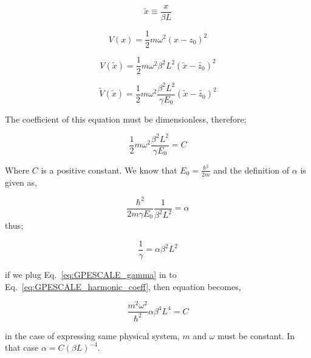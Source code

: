 \documentclass[a4paper,times,hidelinks,12pt]{article}
\begin{document}
\begin{equation}
\label{eq:GPESCALE_dimensionless_length}
    \widetilde{x} \equiv \frac{x}{\beta L} 
\end{equation}

\begin{equation}
\label{eq:GPESCALE_harmonic_potential}
    V(x) = \frac{1}{2}m\omega^2 (x-z_0)^2
\end{equation}

\begin{equation}
\label{eq:GPESCALE_harmonic_length_transform}
    V(\widetilde{x}) = \frac{1}{2}m\omega^2 \beta^2 L^2 (\widetilde{x}-\widetilde{z_0})^2
\end{equation}

\begin{equation}
\label{eq:GPESCALE_harmonic_energy_transform}
    \widetilde{V}(\widetilde{x}) = \frac{1}{2} m\omega^2 \frac{\beta^2 L^2}{\gamma E_0} (\widetilde{x}-\widetilde{z_0})^2  
\end{equation}

The coefficient of this equation must be dimensionless, therefore;

\begin{equation}
\label{eq:GPESCALE_harmonic_coeff}
    \frac{1}{2} m\omega^2 \frac{\beta^2 L^2}{\gamma E_0} = C
\end{equation}

Where $C$ is a positive constant. We know that $E_0 = \frac{\hbar^2}{2m}$ and the definition of $\alpha$ is given as,

\begin{equation}
\label{eq:GPESCALE_alpha}
    \frac{\hbar^2}{2m\gamma E_0} \frac{1}{\beta^2 L^2} = \alpha
\end{equation}
thus;

\begin{equation}
\label{eq:GPESCALE_gamma}
     \frac{1}{\gamma} = \alpha \beta^2 L^2
\end{equation}

if we plug Eq.~\eqref{eq:GPESCALE_gamma} in to Eq.~\eqref{eq:GPESCALE_harmonic_coeff}, then equation becomes,

\begin{equation}
\label{eq:GPESCALE_harmonic_coeff_2}
    \frac{m^2\omega^2}{\hbar^2} \alpha \beta^4 L^4 = C 
\end{equation} 

in the case of expressing same physical system, $m$ and $\omega$ must be constant. In that case $\alpha = C (\beta L)^{-4}$.\\
\end{document}
